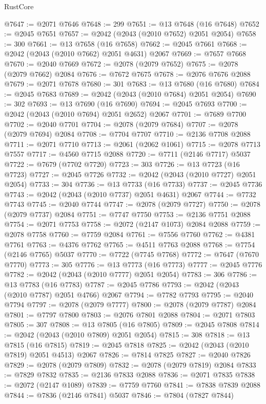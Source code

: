\begin{lexlean}{RustCore}
\begin{coremodule}
@7647 := @2071 @7646
@7648 := 299
@7651 := @13 @7648 (@16 @7648)
@7652 := @2045 @7651
@7657 := @2042 (@2043 (@2010 @7652) @2051 @2054)
@7658 := 300
@7661 := @13 @7658 (@16 @7658)
@7662 := @2045 @7661
@7668 := @2042 (@2043 (@2010 @7662) @2051 @4631) @2067
@7669 := @7657 @7668
@7670 := @2040 @7669
@7672 := @2078 (@2079 @7652)
@7675 := @2078 (@2079 @7662) @2084
@7676 := @7672 @7675
@7678 := @2076 @7676 @2088
@7679 := @2071 @7678
@7680 := 301
@7683 := @13 @7680 (@16 @7680)
@7684 := @2045 @7683
@7689 := @2042 (@2043 (@2010 @7684) @2051 @2054)
@7690 := 302
@7693 := @13 @7690 (@16 @7690)
@7694 := @2045 @7693
@7700 := @2042 (@2043 (@2010 @7694) @2051 @2652) @2067
@7701 := @7689 @7700
@7702 := @2040 @7701
@7704 := @2078 (@2079 @7684)
@7707 := @2078 (@2079 @7694) @2084
@7708 := @7704 @7707
@7710 := @2136 @7708 @2088
@7711 := @2071 @7710
@7713 := @2061 (@2062 @1061)
@7715 := @2078 @7713 @7557
@7717 := @4560 @7715 @2088
@7720 := @7711 (@2146 @7717) @5037
@7722 := @7679 (@7702 @7720)
@7723 := 303
@7726 := @13 @7723 (@16 @7723)
@7727 := @2045 @7726
@7732 := @2042 (@2043 (@2010 @7727) @2051 @2054)
@7733 := 304
@7736 := @13 @7733 (@16 @7733)
@7737 := @2045 @7736
@7743 := @2042 (@2043 (@2010 @7737) @2051 @4631) @2067
@7744 := @7732 @7743
@7745 := @2040 @7744
@7747 := @2078 (@2079 @7727)
@7750 := @2078 (@2079 @7737) @2084
@7751 := @7747 @7750
@7753 := @2136 @7751 @2088
@7754 := @2071 @7753
@7758 := @2072 (@2147 @1073) @2084 @2088
@7759 := @2078 @7758
@7760 := @7759 @2084
@7761 := @7556 @7760
@7762 := @4381 @7761
@7763 := @4376 @7762
@7765 := @4511 @7763 @2088
@7768 := @7754 (@2146 @7765) @5037
@7770 := @7722 (@7745 @7768)
@7772 := @7647 (@7670 @7770)
@7773 := 305
@7776 := @13 @7773 (@16 @7773)
@7777 := @2045 @7776
@7782 := @2042 (@2043 (@2010 @7777) @2051 @2054)
@7783 := 306
@7786 := @13 @7783 (@16 @7783)
@7787 := @2045 @7786
@7793 := @2042 (@2043 (@2010 @7787) @2051 @4766) @2067
@7794 := @7782 @7793
@7795 := @2040 @7794
@7797 := @2078 (@2079 @7777)
@7800 := @2078 (@2079 @7787) @2084
@7801 := @7797 @7800
@7803 := @2076 @7801 @2088
@7804 := @2071 @7803
@7805 := 307
@7808 := @13 @7805 (@16 @7805)
@7809 := @2045 @7808
@7814 := @2042 (@2043 (@2010 @7809) @2051 @2054)
@7815 := 308
@7818 := @13 @7815 (@16 @7815)
@7819 := @2045 @7818
@7825 := @2042 (@2043 (@2010 @7819) @2051 @4513) @2067
@7826 := @7814 @7825
@7827 := @2040 @7826
@7829 := @2078 (@2079 @7809)
@7832 := @2078 (@2079 @7819) @2084
@7833 := @7829 @7832
@7835 := @2136 @7833 @2088
@7836 := @2071 @7835
@7838 := @2072 (@2147 @1089)
@7839 := @7759 @7760
@7841 := @7838 @7839 @2088
@7844 := @7836 (@2146 @7841) @5037
@7846 := @7804 (@7827 @7844)

\end{coremodule}
\end{lexlean}

